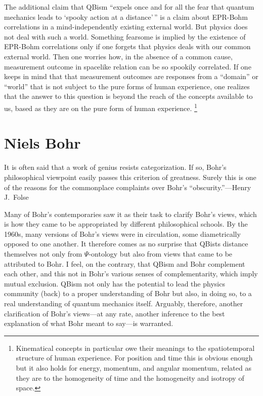 \documentclass[12pt]{article}
\begin{document}
The additional claim that QBism ``expels once and for all the fear that quantum mechanics leads to `spooky action at a distance'\,''\cite{Fuchs_Perimeter} is a claim about EPR-Bohm correlations in a mind-independently existing external world. But physics does not deal with such a world. Something fearsome is implied by the existence of EPR-Bohm correlations only if one forgets that physics deals with our common external world. Then one worries how, in the absence of a common cause, measurement outcome in spacelike relation can be so spookily correlated. If one keeps in mind that that measurement outcomes are responses from a ``domain'' or ``world'' that is not subject to the pure forms of human experience, one realizes that the answer to this question is beyond the reach of the concepts available to us, based as they are on the pure form of human experience.%
\footnote{Kinematical concepts in particular owe their meanings to the spatiotemporal structure of human experience. For position and time this is obvious enough but it also holds for energy, momentum, and angular momentum, related as they are to the homogeneity of time and the homogeneity and isotropy of space.}


\section{Niels Bohr}\label{sec.Bohr}
{\leftskip\parindent\small It is often said that a work of genius resists categorization. If so, Bohr's philosophical viewpoint easily passes this criterion of greatness. Surely this is one of the reasons for the commonplace complaints over Bohr's ``obscurity.''---Henry J.\ Folse \cite{Folse}\par}\medskip

\noindent Many of Bohr's contemporaries saw it as their task to clarify Bohr's views, which is how they came to be appropriated by different philosophical schools. By the 1960s, many versions of Bohr's views were in circulation, some diametrically opposed to one another. It therefore comes as no surprise that QBists distance themselves not only from $\Psi$-ontology but also from views that came to be attributed to Bohr. I feel, on the contrary, that QBism and Bohr complement each other, and this not in Bohr's various senses of complementarity, which imply mutual exclusion. QBism not only has the potential to lead the physics community (back) to a proper understanding of Bohr but also, in doing so, to a real understanding of quantum mechanics itself. Arguably, therefore, another clarification of Bohr's views---at any rate, another inference to the best explanation of what Bohr meant to say---is warranted.
\end{document}
